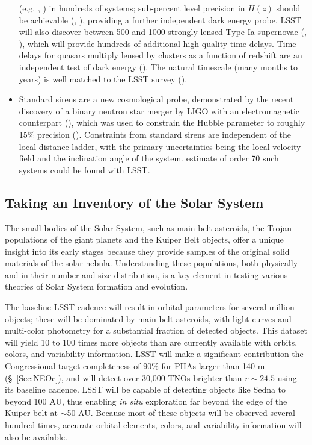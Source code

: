 \begin{itemize}
(e.g. \cite{Suyu2010}, \cite{Bonvin2017}) in hundreds of systems; sub-percent level precision in
$H(z)$ should be achievable (\cite{Coe2009}, \cite{Treu2016}), providing a further independent dark energy probe.
LSST will also discover between 500 and 1000 strongly lensed Type Ia supernovae (\cite{Goldstein2017}, \cite{Goldstein2017}), which will provide hundreds of additional high-quality time delays.
Time delays for quasars multiply lensed by clusters as a function of redshift are an independent test
of dark energy (\cite{Kundic1997}). The natural timescale (many months to years) is well matched
to the LSST survey (\cite{Oguri2010}).
\item Standard sirens are a new cosmological probe, demonstrated by the recent discovery of a binary
  neutron star merger by LIGO with an electromagnetic counterpart (\cite{Abbott2017a}), which was
  used to constrain the Hubble parameter to roughly 15\% precision (\cite{Abbott2017b}).
  Constraints from standard sirens are independent of the local distance ladder, with the primary
  uncertainties being the local velocity field and the inclination angle of the system.  \cite{Scolnic2017}
  estimate of order 70 such systems could be found with LSST.
\end{itemize}


\subsection{Taking an Inventory of the Solar System}



The small bodies of the Solar System, such as main-belt asteroids,
the Trojan populations of the giant planets and the Kuiper Belt objects,
offer a unique insight into its early stages because they provide
samples of the original solid materials of the solar nebula.
Understanding these populations, both physically and in their number
and size distribution, is a key element in testing various theories of
Solar System formation and evolution.

The baseline LSST cadence will result in orbital parameters for several
million objects; these will be dominated by main-belt asteroids, with
light curves and multi-color photometry for a substantial fraction of detected objects.
This dataset will yield 10 to 100 times more objects than are currently
available with orbits, colors, and variability information. LSST will make a significant contribution the Congressional target
completeness of 90\% for PHAs larger than 140 m (\S~\ref{Sec:NEOc}), and will detect over 30,000 TNOs brighter than $r\sim24.5$ using its baseline cadence. LSST will be capable
of detecting objects like Sedna to beyond 100 AU, thus enabling {\it in situ} exploration
far beyond the edge of the Kuiper belt at $\sim$50 AU. Because most of these
objects will be observed several hundred times, accurate orbital elements,
colors, and variability information will also be available.


